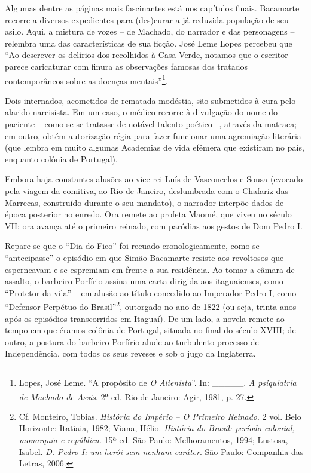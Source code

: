 Algumas dentre as páginas mais fascinantes está nos capítulos finais.
Bacamarte recorre a diversos expedientes para (des)curar a já reduzida
população de seu asilo. Aqui, a mistura de vozes -- de Machado, do
narrador e das personagens -- relembra uma das características de sua
ficção. José Leme Lopes percebeu que ``Ao descrever os delírios dos
recolhidos à Casa Verde, notamos que o escritor parece caricaturar com
finura as observações famosas dos tratados contemporâneos sobre as
doenças mentais''\footnote{Lopes, José Leme. ``A propósito de \emph{O
  Alienista}''. In: \_\_\_\_\_. \emph{A psiquiatria de Machado de
  Assis}. 2\textsuperscript{a} ed. Rio de Janeiro: Agir, 1981, p. 27.}.

Dois internados, acometidos de rematada modéstia, são submetidos à cura
pelo alarido narcisista. Em um caso, o médico recorre à divulgação do
nome do paciente -- como se se tratasse de notável talento poético --,
através da matraca; em outro, obtém autorização régia para fazer
funcionar uma agremiação literária (que lembra em muito algumas
Academias de vida efêmera que existiram no país, enquanto colônia de
Portugal).

Embora haja constantes alusões ao vice-rei Luís de Vasconcelos e Sousa
(evocado pela viagem da comitiva, ao Rio de Janeiro, deslumbrada com o
Chafariz das Marrecas, construído durante o seu mandato), o narrador
interpõe dados de época posterior no enredo. Ora remete ao profeta
Maomé, que viveu no século VII; ora avança até o primeiro reinado, com
paródias aos gestos de Dom Pedro I.

Repare-se que o ``Dia do Fico'' foi recuado cronologicamente, como se
``antecipasse'' o episódio em que Simão Bacamarte resiste aos revoltosos
que esperneavam e se espremiam em frente a sua residência. Ao tomar a
câmara de assalto, o barbeiro Porfírio assina uma carta dirigida aos
itaguaienses, como ``Protetor da vila'' -- em alusão ao título concedido
ao Imperador Pedro I, como ``Defensor Perpétuo do Brasil''\footnote{Cf.
  Monteiro, Tobias. \emph{História do Império -- O Primeiro Reinado}. 2
  vol. Belo Horizonte: Itatiaia, 1982; Viana, Hélio. \emph{História do
  Brasil: período colonial, monarquia e república}. 15ª ed. São Paulo:
  Melhoramentos, 1994; Lustosa, Isabel. \emph{D. Pedro I: um herói sem
  nenhum caráter}. São Paulo: Companhia das Letras, 2006.}, outorgado no
ano de 1822 (ou seja, trinta anos após os episódios transcorridos em
Itaguaí). De um lado, a novela remete ao tempo em que éramos colônia de
Portugal, situada no final do século XVIII; de outro, a postura do
barbeiro Porfírio alude ao turbulento processo de Independência, com
todos os seus reveses e sob o jugo da Inglaterra.

